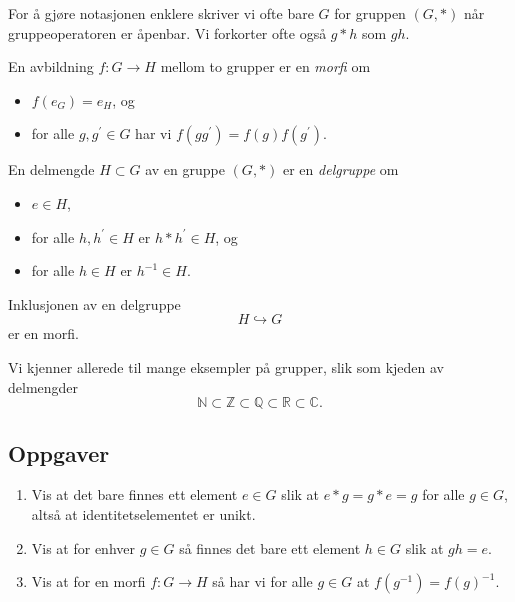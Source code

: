 For å gjøre notasjonen enklere skriver vi ofte bare $G$ for gruppen $(G,\ast)$
når gruppeoperatoren er åpenbar.
Vi forkorter ofte også $g\ast h$ som $gh$.

\begin{definition}
    En avbildning $f\colon G\to H$ mellom to grupper
    er en \textit{morfi} om
    \begin{itemize}
        \item $f(e_G) = e_H$, og
        \item for alle $g, g^\prime\in G$ har vi $f(gg^\prime) = f(g)f(g^\prime)$.
    \end{itemize}
\end{definition}

\begin{definition}
    En delmengde $H\subset G$ av en gruppe $(G, \ast)$ er en \textit{delgruppe}
    om
    \begin{itemize}
        \item $e\in H$,
        \item for alle $h, h^\prime \in H$ er $h\ast h^\prime\in H$,
            og
        \item for alle $h\in H$ er $h^{-1}\in H$.
    \end{itemize}
\end{definition}

\begin{remark}
    Inklusjonen av en delgruppe
    \[
        H\hookrightarrow G
    \]
    er en morfi.
\end{remark}

\begin{example}
    Vi kjenner allerede til mange eksempler på grupper,
    slik som kjeden av delmengder
    \[
        \mathbb N
        \subset \mathbb Z
        \subset \mathbb Q
        \subset \mathbb R
        \subset \mathbb C.
    \]
\end{example}

\subsection{Oppgaver}
\begin{enumerate}
    \item Vis at det bare finnes ett element $e\in G$ slik
        at $e \ast g = g\ast e = g$ for alle $g\in G$,
        altså at identitetselementet er unikt.
    \item Vis at for enhver $g\in G$ så finnes det bare ett element
        $h\in G$ slik at $gh = e$.
    \item Vis at for en morfi $f\colon G\to H$
        så har vi for alle $g\in G$ at $f(g^{-1}) = {f(g)}^{-1}$.
\end{enumerate}
